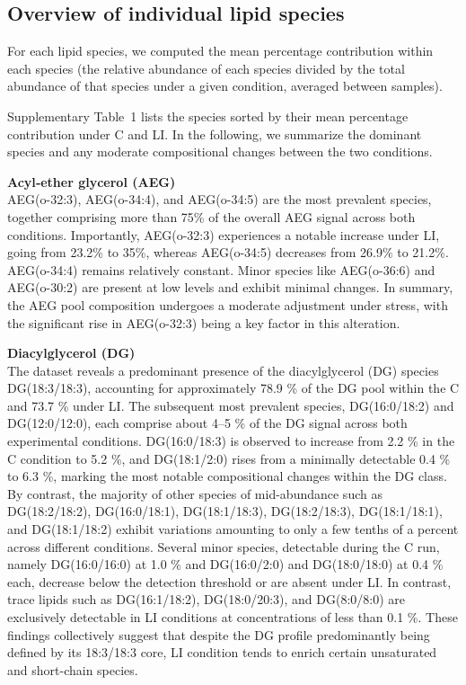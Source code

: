 \documentclass[10pt,letterpaper]{article}
\begin{document}
\subsection*{Overview of individual lipid species}
For each lipid species, we computed the mean percentage contribution within each species (the relative abundance of each species divided by the total abundance of that species under a given condition, averaged between samples). 

Supplementary Table~1 lists the species sorted by their mean percentage contribution under C and LI. In the following, we summarize the dominant species and any moderate compositional changes between the two conditions.

\bigskip
\textbf{Acyl‐ether glycerol (AEG)}  \\
AEG(o-32:3), AEG(o-34:4), and AEG(o-34:5) are the most prevalent species, together comprising more than 75\% of the overall AEG signal across both conditions. Importantly, AEG(o-32:3) experiences a notable increase under LI, going from 23.2\% to 35\%, whereas AEG(o-34:5) decreases from 26.9\% to 21.2\%. AEG(o-34:4) remains relatively constant. Minor species like AEG(o-36:6) and AEG(o-30:2) are present at low levels and exhibit minimal changes. In summary, the AEG pool composition undergoes a moderate adjustment under stress, with the significant rise in AEG(o-32:3) being a key factor in this alteration.

\textbf{Diacylglycerol (DG)}  \\
The dataset reveals a predominant presence of the diacylglycerol (DG) species DG(18:3/18:3), accounting for approximately 78.9 \% of the DG pool within the C and 73.7 \% under LI. The subsequent most prevalent species, DG(16:0/18:2) and DG(12:0/12:0), each comprise about 4–5 \% of the DG signal across both experimental conditions. DG(16:0/18:3) is observed to increase from 2.2 \% in the C condition to 5.2 \%, and DG(18:1/2:0) rises from a minimally detectable 0.4 \% to 6.3 \%, marking the most notable compositional changes within the DG class. By contrast, the majority of other species of mid-abundance such as DG(18:2/18:2), DG(16:0/18:1), DG(18:1/18:3), DG(18:2/18:3), DG(18:1/18:1), and DG(18:1/18:2) exhibit variations amounting to only a few tenths of a percent across different conditions. Several minor species, detectable during the C run, namely DG(16:0/16:0) at 1.0 \% and DG(16:0/2:0) and DG(18:0/18:0) at 0.4 \% each, decrease below the detection threshold or are absent under LI. In contrast, trace lipids such as DG(16:1/18:2), DG(18:0/20:3), and DG(8:0/8:0) are exclusively detectable in LI conditions at concentrations of less than 0.1 \%. These findings collectively suggest that despite the DG profile predominantly being defined by its 18:3/18:3 core, LI condition tends to enrich certain unsaturated and short-chain species.
\end{document}
